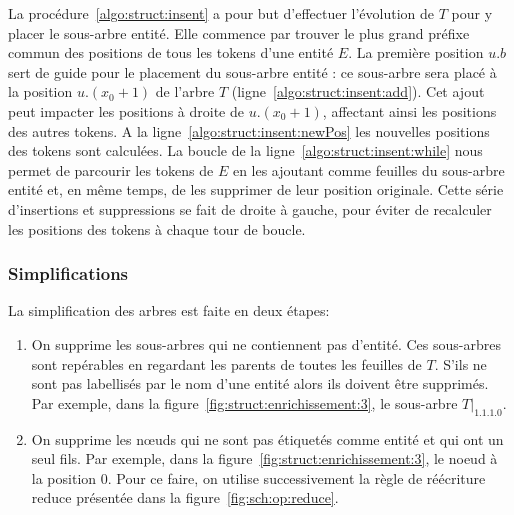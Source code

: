 La procédure~\ref{algo:struct:insent} a pour but d'effectuer l'évolution de $T$ pour y placer le sous-arbre entité.
Elle commence par trouver le plus grand préfixe commun des positions de tous les tokens d'une entité $E$.
La première position $u.b$ sert de guide pour le placement du sous-arbre entité : ce sous-arbre sera placé à la position $u.(x_0+1)$ de l'arbre $T$ (ligne~\ref{algo:struct:insent:add}).
Cet ajout peut impacter les positions à droite de $u.(x_0+1)$, affectant ainsi les positions des autres tokens.
A la ligne~\ref{algo:struct:insent:newPos} les nouvelles positions des tokens sont calculées.
La boucle de la ligne~\ref{algo:struct:insent:while} nous permet de parcourir les tokens de $E$ en les ajoutant comme feuilles du sous-arbre entité et, en même temps, de les supprimer de leur position originale.
Cette série d'insertions et suppressions se fait de droite à gauche, pour éviter de recalculer les positions des tokens à chaque tour de boucle.

\subsubsection{Simplifications}

La simplification des arbres est faite en deux étapes:
\begin{enumerate}
    \item On supprime les sous-arbres qui ne contiennent pas d'entité.
          Ces sous-arbres sont repérables en regardant les parents de toutes les feuilles de $T$.
          S'ils ne sont pas labellisés par le nom d'une entité alors ils doivent être supprimés.
          Par exemple, dans la figure~\ref{fig:struct:enrichissement:3}, le sous-arbre $T|_{1.1.1.0}$.

    \item On supprime les nœuds qui ne sont pas étiquetés comme entité et qui ont un seul fils.
          Par exemple, dans la figure~\ref{fig:struct:enrichissement:3}, le noeud à la position $0$.
          Pour ce faire, on utilise successivement la règle de réécriture \textsf{reduce} présentée dans la figure~\ref{fig:sch:op:reduce}.
\end{enumerate}

